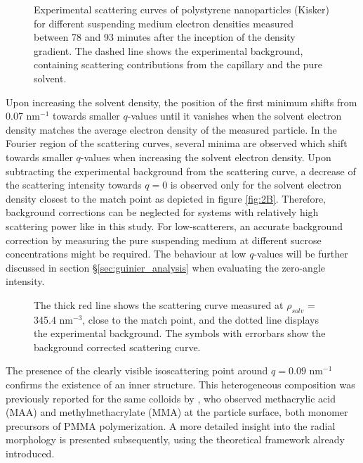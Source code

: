 \begin{figure}%
	\centering
		
		\caption{Experimental scattering curves of polystyrene nanoparticles (Kisker) for different suspending medium electron densities measured between 78 and 93 minutes after the inception of the density gradient. The dashed line shows the experimental background, containing scattering contributions from the capillary and the pure solvent.}
		\label{fig:KiskerContinuousSAXS}
\end{figure}

Upon increasing the solvent density, the position of the first minimum shifts from 0.07 nm\(^{-1}\) towards smaller \(q\)-values until it vanishes when the solvent electron density matches the average electron density of the measured particle. In the Fourier region of the scattering curves, several minima are observed which shift towards smaller \(q\)-values when increasing the solvent electron density. Upon subtracting the experimental background from the scattering curve, a decrease of the scattering intensity towards $q=0$ is observed only for the solvent electron density closest to the match point as depicted in figure \ref{fig:2B}. Therefore, background corrections can be neglected for systems with relatively high scattering power like in this study. For low-scatterers, an accurate background correction by measuring the pure suspending medium at different sucrose concentrations might be required. The behaviour at low $q$-values will be further discussed in section \S\ref{sec:guinier_analysis} when evaluating the zero-angle intensity.

\begin{figure}%
	\centering
		
		\caption{The thick red line shows the scattering curve measured at $\rho_{solv}$ = 345.4 nm$^{-3}$, close to the match point, and the dotted line displays the experimental background. The symbols with errorbars show the background corrected scattering curve.}
		\label{fig:KiskerBackgroundSubtraction}
\end{figure}

The presence of the clearly visible isoscattering point around \(q=0.09\) nm\(^{-1}\) confirms the existence of an inner structure. This heterogeneous composition was previously reported for the same colloids by \citet{Minelli2014}, who observed methacrylic acid (MAA) and methylmethacrylate (MMA) at the particle surface, both monomer precursors of PMMA polymerization. A more detailed insight into the radial morphology is presented subsequently, using the theoretical framework already introduced.

